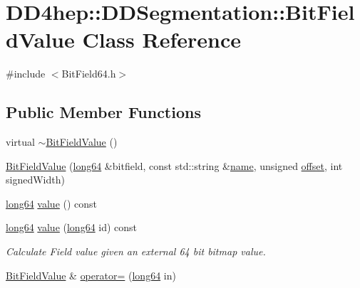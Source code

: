 \hypertarget{class_d_d4hep_1_1_d_d_segmentation_1_1_bit_field_value}{}\section{D\+D4hep\+:\+:D\+D\+Segmentation\+:\+:Bit\+Field\+Value Class Reference}
\label{class_d_d4hep_1_1_d_d_segmentation_1_1_bit_field_value}


{\ttfamily \#include $<$Bit\+Field64.\+h$>$}

\subsection*{Public Member Functions}
\begin{DoxyCompactItemize}
\item 
virtual \hyperlink{class_d_d4hep_1_1_d_d_segmentation_1_1_bit_field_value_a182cf1a9ae2449b88fb89f37bba2abb7}{$\sim$\+Bit\+Field\+Value} ()
\item 
\hyperlink{class_d_d4hep_1_1_d_d_segmentation_1_1_bit_field_value_aa8ff52eb2b15cd6a50d6db56b658c80e}{Bit\+Field\+Value} (\hyperlink{namespace_d_d4hep_ac2a70e722b33dc7ddaa20db8954ac836}{long64} \&bitfield, const std\+::string \&\hyperlink{class_d_d4hep_1_1_d_d_segmentation_1_1_bit_field_value_a9f9c250d23c05ff2695d9ec4e2b7ffc9}{name}, unsigned \hyperlink{class_d_d4hep_1_1_d_d_segmentation_1_1_bit_field_value_ab8aa1a30c457ac06641276a2e10e647d}{offset}, int signed\+Width)
\item 
\hyperlink{namespace_d_d4hep_ac2a70e722b33dc7ddaa20db8954ac836}{long64} \hyperlink{class_d_d4hep_1_1_d_d_segmentation_1_1_bit_field_value_a46fee9b58df6cfc614afdbf6e82e7e80}{value} () const
\item 
\hyperlink{namespace_d_d4hep_ac2a70e722b33dc7ddaa20db8954ac836}{long64} \hyperlink{class_d_d4hep_1_1_d_d_segmentation_1_1_bit_field_value_a0a5cb58e7b01918973a0768b766f9bb6}{value} (\hyperlink{namespace_d_d4hep_ac2a70e722b33dc7ddaa20db8954ac836}{long64} id) const
\begin{DoxyCompactList}\small\item\em Calculate Field value given an external 64 bit bitmap value. \end{DoxyCompactList}\item 
\hyperlink{class_d_d4hep_1_1_d_d_segmentation_1_1_bit_field_value}{Bit\+Field\+Value} \& \hyperlink{class_d_d4hep_1_1_d_d_segmentation_1_1_bit_field_value_a0d388c5d7d243d80da663a23b420cfde}{operator=} (\hyperlink{namespace_d_d4hep_ac2a70e722b33dc7ddaa20db8954ac836}{long64} in)

\end{DoxyCompactItemize}
